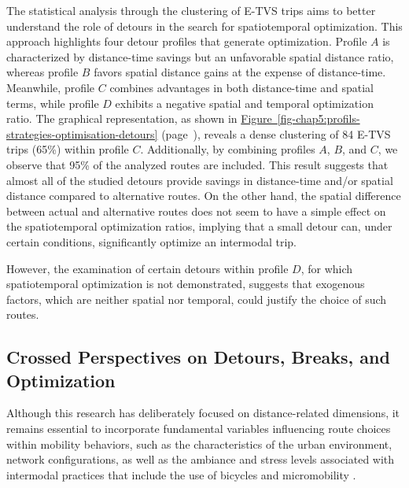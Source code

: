 \begin{refsegment}
The statistical analysis through the clustering of \acrshort{E-TVS} trips aims to better understand the role of detours in the search for spatiotemporal optimization. This approach highlights four detour profiles that generate optimization. Profile \(A\) is characterized by distance-time savings but an unfavorable spatial distance ratio, whereas profile \(B\) favors spatial distance gains at the expense of distance-time. Meanwhile, profile \(C\) combines advantages in both distance-time and spatial terms, while profile \(D\) exhibits a negative spatial and temporal optimization ratio. The graphical representation, as shown in \hyperref[fig-chap5:profils-strategies-optimisation-detours]{Figure~\ref{fig-chap5:profils-strategies-optimisation-detours}} (page~\pageref{fig-chap5:profils-strategies-optimisation-detours}), reveals a dense clustering of 84 \acrshort{E-TVS} trips (65\%) within profile \(C\). Additionally, by combining profiles \(A\), \(B\), and \(C\), we observe that 95\% of the analyzed routes are included. This result suggests that almost all of the studied detours provide savings in distance-time and/or spatial distance compared to alternative routes. On the other hand, the spatial difference between actual and alternative routes does not seem to have a simple effect on the spatiotemporal optimization ratios, implying that a small detour can, under certain conditions, significantly optimize an intermodal trip.%

However, the examination of certain detours within profile \(D\), for which spatiotemporal optimization is not demonstrated, suggests that exogenous factors, which are neither spatial nor temporal, could justify the choice of such routes.%

\subsection{Crossed Perspectives on Detours, Breaks, and Optimization
    \label{chap5:discussion-detours-pauses-optimisation}
    }

Although this research has deliberately focused on distance-related dimensions, it remains essential to incorporate fundamental variables influencing route choices within mobility behaviors, such as the characteristics of the urban environment, network configurations, as well as the ambiance and stress levels associated with intermodal practices that include the use of bicycles and micromobility \textcolor{blue}{\autocite[79]{zuo_incorporating_2021}}.%


\end{refsegment}
